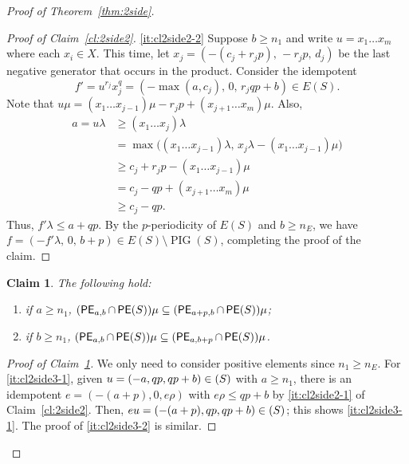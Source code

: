 \documentclass[reqno]{amsart}
\theoremstyle{plain}
\newtheorem{claim}{Claim}[lem]
\theoremstyle{definition}
\DeclareMathOperator{\PIG}{PIG}
\let\P\relax
\DeclareMathOperator{\P}{\textup{\textsf{P}}}
\DeclareMathOperator{\PE}{\textup{\textsf{PE}}}
\numberwithin{equation}{section}
\begin{document}
\begin{proof}[Proof of Theorem~\ref{thm:2side}]
\begin{proof}[Proof of Claim~\ref{cl:2side2}]
\ref{it:cl2side2-2} Suppose $b\geq n_1$ and write $u = x_1\dots x_m$ where each $x_i\in X$. This time, let $x_j = (-(c_j+r_jp), \, -r_jp,\, d_j)$ be the last negative generator that occurs in the product. Consider the idempotent 
\[
f' = u^{r_j}x_j^{q} = (-\max(a,c_j),\, 0,\, r_jqp+b)\in E(S).
\]
Note that $u\mu = (x_1\dots x_{j-1})\mu - r_jp + (x_{j+1}\dots x_m)\mu$. Also, 
\begin{align*}
    a = u\lambda &\geq (x_1\dots x_{j})\lambda \\
    &=\max\bigl((x_1\dots x_{j-1})\lambda,\, x_j\lambda - (x_1\dots x_{j-1})\mu\bigr)\\
    &\geq c_j+r_jp-(x_1\dots x_{j-1})\mu \\
    &= c_{j} - qp + (x_{j+1}\dots x_m)\mu\\
    &\geq c_j - qp.
\end{align*}
Thus, $f'\lambda \leq a+qp$. By the $p$-periodicity of $E(S)$ and $b\geq n_E$, we have $f = (-f'\lambda, \, 0, \, b+p)\in E(S)\setminus\PIG(S)$, completing the proof of the claim.
\end{proof}

\begin{claim}
\label{cl:2side3}
The following hold:
\begin{enumerate}[topsep=0mm, leftmargin=14mm,itemsep=1mm,label=\textup{(\arabic*)}]
\item \label{it:cl2side3-1} if $a\geq n_1$, $(\PE_{a,b}\cap \PE(S))\mu \subseteq (\PE_{a+p, b}\cap \PE(S))\mu$;
\item \label{it:cl2side3-2} if $b\geq n_1$, $(\PE_{a,b}\cap \PE(S))\mu \subseteq (\PE_{a, b+p}\cap \PE(S))\mu$.
\end{enumerate}
\end{claim}

\begin{proof}[Proof of Claim~\ref{cl:2side3}]
We only need to consider positive elements since $n_1\geq n_E$. For \ref{it:cl2side3-1}, given $u = (-a, qp, qp+b)\in \P(S)$ with $a\geq n_1$, there is an idempotent $e = (-(a+p), 0, e\rho)$ with $e\rho\leq qp+b$ by \ref{it:cl2side2-1} of Claim~\ref{cl:2side2}. Then, $eu = (-(a+p), qp, qp+b)\in \P(S)$; this shows \ref{it:cl2side3-1}. The proof of \ref{it:cl2side3-2} is similar.
\end{proof}


\end{proof}
\end{document}
